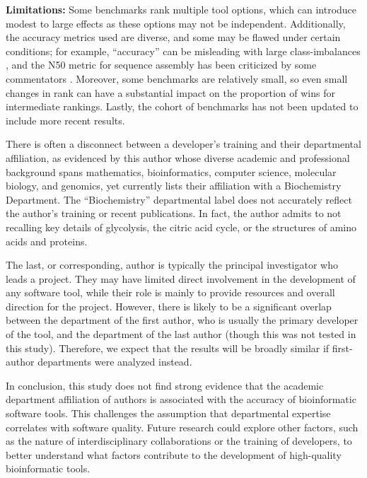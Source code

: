 \documentclass[fleqn,10pt,doc,onecolumn]{SelfArx}%
\begin{document}
\textbf{Limitations:} Some benchmarks rank multiple tool options,
which can introduce modest to large effects as these options may not
be independent. Additionally, the accuracy metrics used are diverse,
and some may be flawed under certain conditions; for example,
``accuracy'' can be misleading with large class-imbalances
\cite{luque2019impact}, and the N50 metric for sequence assembly has
been criticized by some commentators \cite{xie2021pdr}. Moreover, some
benchmarks are relatively small, so even small changes in rank can
have a substantial impact on the proportion of wins for intermediate
rankings. Lastly, the cohort of benchmarks has not been updated to
include more recent results.

There is often a disconnect between a developer’s training and their
departmental affiliation, as evidenced by this author whose diverse
academic and professional background spans mathematics,
bioinformatics, computer science, molecular biology, and genomics, yet
currently lists their affiliation with a Biochemistry Department. The
``Biochemistry'' departmental label does not accurately reflect the
author's training or recent publications. In fact, the author admits
to not recalling key details of glycolysis, the citric acid cycle, or
the structures of amino acids and proteins.

The last, or corresponding, author is typically the principal
investigator who leads a project. They may have limited direct
involvement in the development of any software tool, while
their role is mainly to provide resources and overall direction for
the project. However, there is likely to be a significant overlap between the
department of the first author, who is usually the primary developer
of the tool, and the department of the last author (though this was
not tested in this study). Therefore, we expect that the results will
be broadly similar if first-author departments were analyzed instead.

In conclusion, this study does not find strong evidence that the
academic department affiliation of authors is associated with the
accuracy of bioinformatic software tools. This challenges the
assumption that departmental expertise correlates with
software quality. Future research could explore other factors, such
as the nature of interdisciplinary collaborations or the training
of developers, to better understand what factors contribute to
the development of high-quality bioinformatic tools.

\end{document}
